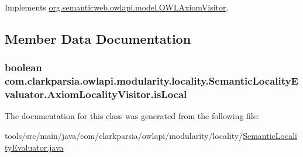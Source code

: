 Implements \hyperlink{interfaceorg_1_1semanticweb_1_1owlapi_1_1model_1_1_o_w_l_axiom_visitor_a5e9f240b97ad056ae124c7301fc961c5}{org.\-semanticweb.\-owlapi.\-model.\-O\-W\-L\-Axiom\-Visitor}.



\subsection{Member Data Documentation}
\hypertarget{classcom_1_1clarkparsia_1_1owlapi_1_1modularity_1_1locality_1_1_semantic_locality_evaluator_1_1_axiom_locality_visitor_af28108f414d5a87aa5ebfb60746b433f}{
\subsubsection[{is\-Local}]{\setlength{\rightskip}{0pt plus 5cm}boolean com.\-clarkparsia.\-owlapi.\-modularity.\-locality.\-Semantic\-Locality\-Evaluator.\-Axiom\-Locality\-Visitor.\-is\-Local\hspace{0.3cm}{\ttfamily [private]}}}\label{classcom_1_1clarkparsia_1_1owlapi_1_1modularity_1_1locality_1_1_semantic_locality_evaluator_1_1_axiom_locality_visitor_af28108f414d5a87aa5ebfb60746b433f}


The documentation for this class was generated from the following file\-:\begin{DoxyCompactItemize}
\item 
tools/src/main/java/com/clarkparsia/owlapi/modularity/locality/\hyperlink{_semantic_locality_evaluator_8java}{Semantic\-Locality\-Evaluator.\-java}\end{DoxyCompactItemize}
